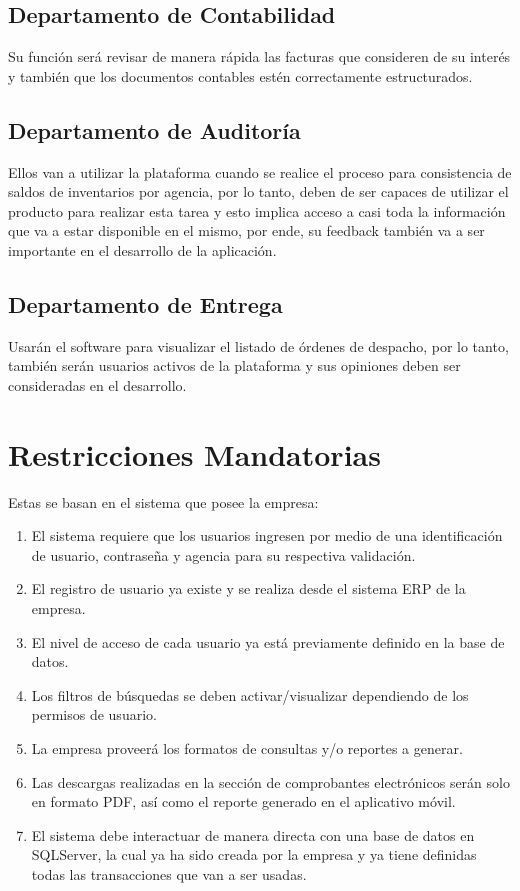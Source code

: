 \documentclass{scrreprt}
\begin{document}
\subsection{Departamento de Contabilidad}
Su función será revisar de manera rápida las facturas que consideren de su interés y también que los documentos contables estén correctamente estructurados. 

\subsection{Departamento de Auditoría}
Ellos van a utilizar la plataforma cuando se realice el proceso para consistencia de saldos de inventarios por agencia, por lo tanto, deben de ser capaces de utilizar el producto para realizar esta tarea y esto implica acceso a casi toda la información que va a estar disponible en el mismo, por ende, su feedback también va a ser importante en el desarrollo de la aplicación. 

\subsection{Departamento de Entrega}
Usarán el software para visualizar el listado de órdenes de despacho, por lo tanto, también serán usuarios activos de la plataforma y sus opiniones deben ser consideradas en el desarrollo. 

\section{Restricciones Mandatorias}
Estas se basan en el sistema que posee la empresa:
\begin{enumerate}
    \item El sistema requiere que los usuarios ingresen por medio de una identificación de usuario, contraseña y agencia para su respectiva validación.
    \item El registro de usuario ya existe y se realiza desde el sistema ERP de la empresa.
    \item El nivel de acceso de cada usuario ya está previamente definido en la base de datos.
    \item Los filtros de búsquedas se deben activar/visualizar dependiendo de los permisos de usuario.
    \item La empresa proveerá los formatos de consultas y/o reportes a generar.
    \item Las descargas realizadas en la sección de comprobantes electrónicos serán solo en formato PDF, así como el reporte generado en el aplicativo móvil.
    \item El sistema debe interactuar de manera directa con una base de datos en SQLServer, la cual ya ha sido creada por la empresa y ya tiene definidas todas las transacciones que van a ser usadas.
\end{enumerate}
\end{document}
